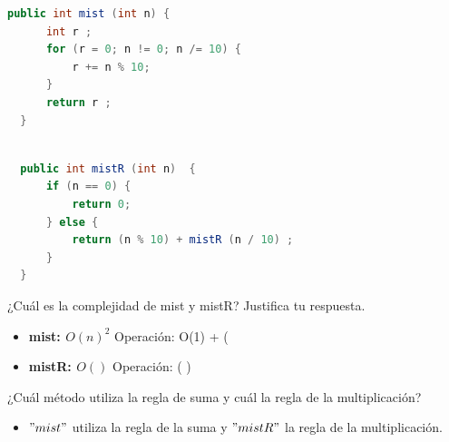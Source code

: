 \documentclass{report}
\begin{document}
\begin{enumerate}
\begin{lstlisting}[language=Java, caption=mist]
  public int mist (int n) {
      int r ;
      for (r = 0; n != 0; n /= 10) {
          r += n % 10;
      }
      return r ;
  }
            \end{lstlisting}
            \begin{lstlisting}[language=Java, caption=mistR]
            
  public int mistR (int n)  {
      if (n == 0) {
          return 0;
      } else {
          return (n % 10) + mistR (n / 10) ;
      }
  }
            \end{lstlisting}
        \newline ¿Cuál es la complejidad de mist y mistR? Justifica tu respuesta.
        \begin{itemize}
            \item \textbf{mist: $O(n)^2$}  Operación: O(1) + ( 
            \item \textbf{mistR: $O( ) $}  Operación: ( )  
        \end{itemize}
        \newline ¿Cuál método utiliza la regla de suma y cuál la regla de la multiplicación?
        \begin{itemize} 
            \item $"mist"$ utiliza la regla de la suma y $"mistR"$ la regla de la multiplicación.
        \end{itemize}
    \end{enumerate}
\end{document}
